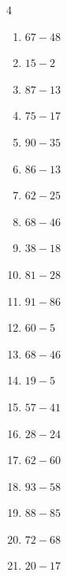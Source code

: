 \begin{multicols}{4}
\begin{enumerate}
  \item $67-48$
        \phantom{$=19$}

  \item $15-2$
        \phantom{$=13$}

\columnbreak %

\resetques

  \item $87-13$
        \phantom{$=74$}

  \item $75-17$
        \phantom{$=58$}

  \item $90-35$
        \phantom{$=55$}

  \item $86-13$
        \phantom{$=73$}

  \item $62-25$
        \phantom{$=37$}

  \item $68-46$
        \phantom{$=22$}

  \item $38-18$
        \phantom{$=20$}

  \item $81-28$
        \phantom{$=53$}

  \item $91-86$
        \phantom{$=5$}

  \item $60-5$
        \phantom{$=55$}

  \item $68-46$
        \phantom{$=22$}

  \item $19-5$
        \phantom{$=14$}

  \item $57-41$
        \phantom{$=16$}

  \item $28-24$
        \phantom{$=4$}

  \item $62-60$
        \phantom{$=2$}

  \item $93-58$
        \phantom{$=35$}

  \item $88-85$
        \phantom{$=3$}

  \item $72-68$
        \phantom{$=4$}

  \item $20-17$
        \phantom{$=3$}


\end{enumerate}
\end{multicols}
